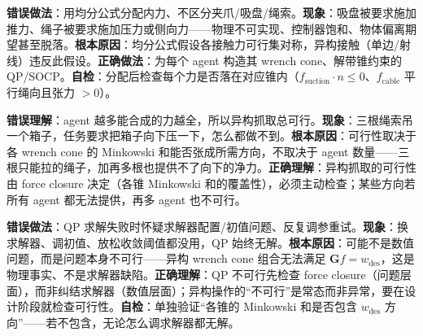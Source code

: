 \begin{pitfall}
\textbf{错误做法}：用均分公式分配内力、不区分夹爪/吸盘/绳索。\textbf{现象}：吸盘被要求施加推力、绳子被要求施加压力或侧向力——物理不可实现、控制器饱和、物体偏离期望甚至脱落。\textbf{根本原因}：均分公式假设各接触力可行集对称，异构接触（单边/射线）违反此假设。\textbf{正确做法}：为每个 agent 构造其 wrench cone、解带锥约束的 QP/SOCP。\textbf{自检}：分配后检查每个力是否落在对应锥内（$f_{\mathrm{suction}}\cdot n\le 0$、$f_{\mathrm{cable}}$ 平行绳向且张力 $>0$）。
\end{pitfall}

\begin{pitfall}
\textbf{错误理解}：agent 越多能合成的力越全，所以异构抓取总可行。\textbf{现象}：三根绳索吊一个箱子，任务要求把箱子向下压一下，怎么都做不到。\textbf{根本原因}：可行性取决于各 wrench cone 的 Minkowski 和能否张成所需方向，不取决于 agent 数量——三根只能拉的绳子，加再多根也提供不了向下的净力。\textbf{正确理解}：异构抓取的可行性由 force closure 决定（各锥 Minkowski 和的覆盖性），必须主动检查；某些方向若所有 agent 都无法提供，再多 agent 也不可行。
\end{pitfall}

\begin{pitfall}
\textbf{错误做法}：QP 求解失败时怀疑求解器配置/初值问题、反复调参重试。\textbf{现象}：换求解器、调初值、放松收敛阈值都没用，QP 始终无解。\textbf{根本原因}：可能不是数值问题，而是问题本身不可行——异构 wrench cone 组合无法满足 $\mathbf{G}f=w_{\mathrm{des}}$，这是物理事实、不是求解器缺陷。\textbf{正确理解}：QP 不可行先检查 force closure（问题层面），而非纠结求解器（数值层面）；异构操作的“不可行”是常态而非异常，要在设计阶段就检查可行性。\textbf{自检}：单独验证“各锥的 Minkowski 和是否包含 $w_{\mathrm{des}}$ 方向”——若不包含，无论怎么调求解器都无解。
\end{pitfall}

